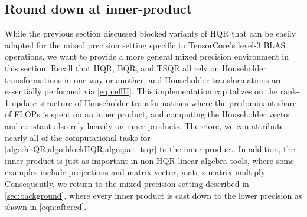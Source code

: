 
\subsection{Round down at inner-product}\label{sec:mp-2}
While the previous section discussed blocked variants of HQR that can be easily adapted for the mixed precision setting specific to TensorCore's level-3 BLAS operations, we want to provide a more general mixed precision environment in this section.
Recall that HQR, BQR, and TSQR all rely on Householder transformations in one way or another, and Householder transformations are essentially performed via \cref{eqn:effH}.
This implementation capitalizes on the rank-1 update structure of Householder transformations where the predominant share of FLOPs is spent on an inner product, and computing the Householder vector and constant also rely heavily on inner products.
Therefore, we can attribute nearly all of the computational tasks for \cref{algo:hhQR,algo:blockHQR,algo:par_tsqr} to the inner product.
In addition, the inner product is just as important in non-HQR linear algebra tools, where some examples include projections and matrix-vector, matrix-matrix multiply.
Consequently, we return to the mixed precision setting described in \cref{sec:background}, where every inner product is cast down to the lower precision as shown in \cref{eqn:aftercd}.
